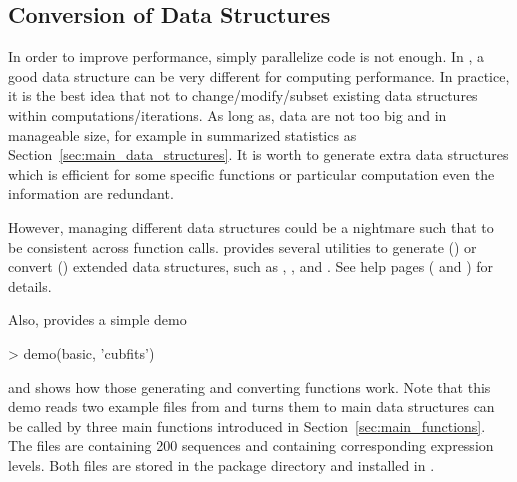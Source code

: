 \subsection[Conversion of Data Structures]{Conversion of Data Structures}
\label{sec:conversion_of_data_strcutures}

In order to improve performance, simply parallelize code is not enough.
In , a good data structure can be very different for computing
performance.
In practice, it is the best idea that not to change/modify/subset existing
data structures within computations/iterations.
As long as, data are not too big and in manageable size,
for example in summarized statistics as Section~\ref{sec:main_data_structures}.
It is worth to generate extra data structures which is efficient
for some specific functions or particular computation even the information
are redundant.

However, managing different data structures could be a nightmare such that
to be consistent across function calls.
 provides several utilities to generate ()
or convert () extended data structures, such as
, , and .
See help pages ( and
) for details.

Also,  provides a simple demo
\begin{Code}
> demo(basic, 'cubfits')
\end{Code}
and shows how those generating and converting functions work.
Note that this demo reads two example files from  and turns them
to main data structures can be called by three main functions introduced in
Section~\ref{sec:main_functions}.
The files are  containing 200 sequences and
 containing corresponding expression levels.
Both files are stored in the package directory 
and installed in .


